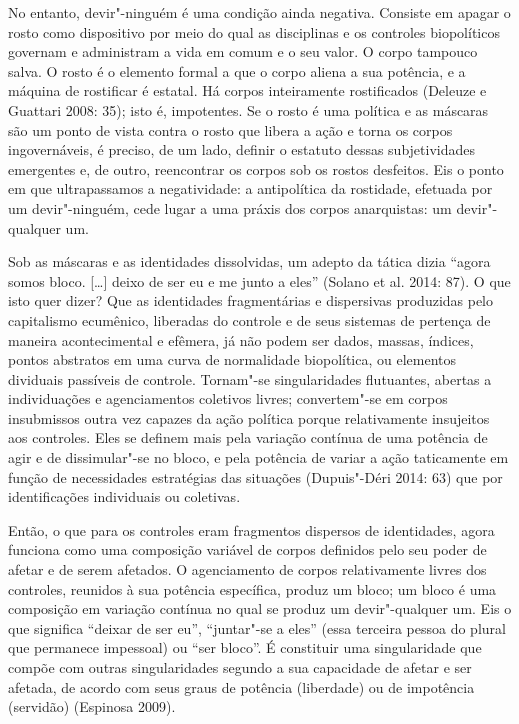 No entanto, devir"-ninguém é uma condição ainda
negativa. Consiste em apagar o rosto como dispositivo por meio do qual
as disciplinas e os controles biopolíticos governam e administram a vida
em comum e o seu valor. O corpo tampouco salva. O rosto é o elemento
formal a que o corpo aliena a sua potência, e a máquina de rostificar é
estatal. Há corpos inteiramente rostificados (Deleuze e Guattari 2008: 35);
isto é, impotentes. Se o rosto é uma política e as máscaras são
um ponto de vista contra o rosto que libera a ação e torna os corpos
ingovernáveis, é preciso, de um lado, definir o estatuto dessas
subjetividades emergentes e, de outro, reencontrar os corpos sob os
rostos desfeitos. Eis o ponto em que ultrapassamos a negatividade: a
antipolítica da rostidade, efetuada por um devir"-ninguém, cede lugar a
uma práxis dos corpos anarquistas: um devir"-qualquer um.

Sob as máscaras e as identidades dissolvidas, um adepto da tática dizia
``agora somos bloco. {[}\ldots{}{]} deixo de ser eu e me junto
a eles'' (Solano et al. 2014: 87). O que isto quer dizer? Que as
identidades fragmentárias e dispersivas produzidas pelo capitalismo
ecumênico, liberadas do controle e de seus sistemas de pertença de
maneira acontecimental e efêmera, já não podem ser dados, massas,
índices, pontos abstratos em uma curva de normalidade biopolítica, ou
elementos dividuais passíveis de controle. Tornam"-se singularidades
flutuantes, abertas a individuações e agenciamentos coletivos livres;
convertem"-se em corpos insubmissos outra vez capazes da ação política
porque relativamente insujeitos aos controles. Eles se definem mais pela
variação contínua de uma potência de agir e de dissimular"-se no bloco, e
pela potência de variar a ação taticamente em função de necessidades
estratégias das situações (Dupuis"-Déri 2014: 63) que por identificações
individuais ou coletivas.

Então, o que para os controles eram fragmentos dispersos de identidades,
agora funciona como uma composição variável de corpos definidos pelo seu
poder de afetar e de serem afetados. O agenciamento de corpos
relativamente livres dos controles, reunidos à sua potência específica,
produz um bloco; um bloco é uma composição em variação contínua no qual
se produz um devir"-qualquer um. Eis o que significa ``deixar de ser
eu'', ``juntar"-se a eles'' (essa terceira pessoa do plural que permanece
impessoal) ou ``ser bloco''. É constituir uma singularidade que compõe
com outras singularidades segundo a sua capacidade de afetar e ser
afetada, de acordo com seus graus de potência (liberdade) ou de
impotência (servidão) (Espinosa 2009).

